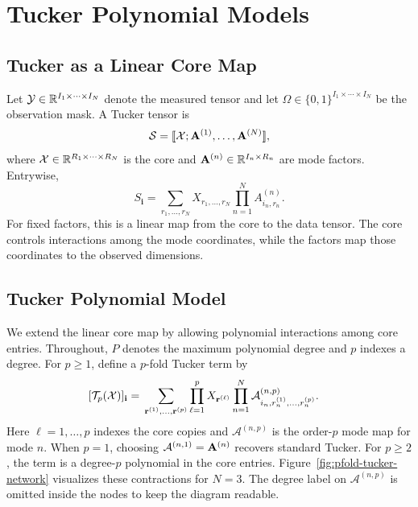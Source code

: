 \section{Tucker Polynomial Models}
\label{sec:model}

\subsection{Tucker as a Linear Core Map}
\label{sec:problem}

Let $\mathcal{Y} \in \mathbb{R}^{I_1 \times \cdots \times I_N}$ denote the measured tensor and
let $\Omega \in \{0,1\}^{I_1 \times \cdots \times I_N}$ be the observation
mask. A Tucker tensor is
\begin{equation}
  \mathcal{S} =
  [\![ \mathcal{X}; \mathbf{A}^{(1)},\ldots,\mathbf{A}^{(N)} ]\!] ,
  \label{eq:latent_tucker}
\end{equation}
where $\mathcal{X} \in \mathbb{R}^{R_1 \times \cdots \times R_N}$ is the core and
$\mathbf{A}^{(n)} \in \mathbb{R}^{I_n \times R_n}$ are mode factors. Entrywise,
\begin{equation}
  S_{\mathbf{i}}
  =
  \sum_{r_1,\ldots,r_N}
  X_{r_1,\ldots,r_N}
  \prod_{n=1}^{N}A^{(n)}_{i_n,r_n}.
  \label{eq:tucker_entry}
\end{equation}
For fixed factors, this is a linear map from the core to the data tensor. The
core controls interactions among the mode coordinates, while the factors map
those coordinates to the observed dimensions.

\subsection{Tucker Polynomial Model}

We extend the linear core map by allowing polynomial interactions among core
entries. Throughout, $P$ denotes the maximum polynomial degree and $p$ indexes
a degree. For $p\ge 1$, define a $p$-fold Tucker term by
\begin{equation}
\begin{aligned}
  [\mathcal{T}_p(\cX)]_{\mathbf{i}}
  ={}&
  \sum_{\mathbf{r}^{(1)},\ldots,\mathbf{r}^{(p)}}
  \prod_{\ell=1}^{p}X_{\mathbf{r}^{(\ell)}}
  \prod_{n=1}^{N}
  \mathcal{A}^{(n,p)}_{
  i_n,r_n^{(1)},\ldots,r_n^{(p)}} .
\end{aligned}
  \label{eq:pfold_tucker}
\end{equation}
Here $\ell=1,\ldots,p$ indexes the core copies and
$\mathcal{A}^{(n,p)}$ is the order-$p$ mode map for mode $n$. When $p=1$,
choosing $\mathcal{A}^{(n,1)}=\mathbf{A}^{(n)}$ recovers standard Tucker. For
$p\ge2$, the term is a degree-$p$ polynomial in the core entries.
Figure~\ref{fig:pfold-tucker-network} visualizes these contractions for $N=3$.
The degree label on $\mathcal A^{(n,p)}$ is omitted inside the nodes to keep the
diagram readable.

